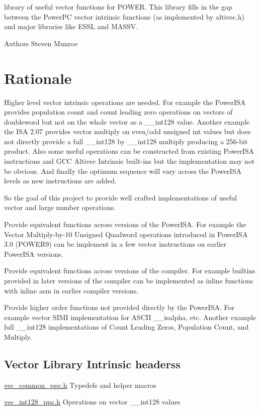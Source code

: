 library of useful vector functions for POWER. This library fills in the gap between the PowerPC vector intrinsic functions (as implemented by altivec.h) and major libraries like ESSL and MASSV. \begin{DoxyAuthor}{Authors}
Steven Munroe
\end{DoxyAuthor}
\hypertarget{index_Rationale}{}\section{Rationale}\label{index_Rationale}
Higher level vector intrinsic operations are needed. For example the PowerISA provides population count and count leading zero operations on vectors of doubleword but not on the whole vector as a \_\-\_\-int128 value. Another example the ISA 2.07 provides vector multiply on even/odd unsigned int values but does not directly provide a full \_\-\_\-int128 by \_\-\_\-int128 multiply producing a 256-\/bit product. Also some useful operations can be constructed from existing PowerISA instructions and GCC Altivec Intrinsic built-\/ins but the implementation may not be obvious. And finally the optimum sequence will vary across the PowerISA levels as new instructions are added.

So the goal of this project to provide well crafted implementations of useful vector and large number operations.


\begin{DoxyItemize}
\item Provide equivalent functions across versions of the PowerISA. For example the Vector Multiply-\/by-\/10 Unsigned Quadword operations introduced in PowerISA 3.0 (POWER9) can be implement in a few vector instructions on earlier PowerISA versions.
\item Provide equivalent functions across versions of the compiler. For example builtins provided in later versions of the compiler can be implemented as inline functions with inline asm in earlier compiler versions.
\item Provide higher order functions not provided directly by the PowerISA. For example vector SIMI implementation for ASCII \_\-\_\-isalpha, etc. Another example full \_\-\_\-int128 implementations of Count Leading Zeros, Population Count, and Multiply.
\end{DoxyItemize}\hypertarget{index_POWER}{}\subsection{Vector Library Intrinsic headerss}\label{index_POWER}

\begin{DoxyItemize}
\item \hyperlink{vec__common__ppc_8h}{vec\_\-common\_\-ppc.h} Typedefs and helper macros
\item \hyperlink{vec__int128__ppc_8h}{vec\_\-int128\_\-ppc.h} Operations on vector \_\-\_\-int128 values 
\end{DoxyItemize}